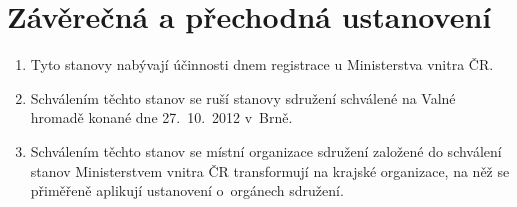 \documentclass[a4paper]{article}
\begin{document}
\section{Závěrečná a přechodná ustanovení}
    \begin{enumerate}
    \item Tyto stanovy nabývají účinnosti dnem registrace u Ministerstva
        vnitra ČR.

    \item Schválením těchto stanov se ruší stanovy sdružení schválené na
        Valné hromadě konané dne 27.~10.~2012 v~Brně.

    \item Schválením těchto stanov se místní organizace sdružení založené do
        schválení stanov Ministerstvem vnitra ČR transformují na krajské
        organizace, na něž se přiměřeně aplikují ustanovení o~orgánech sdružení.
    \end{enumerate}
\end{document}
